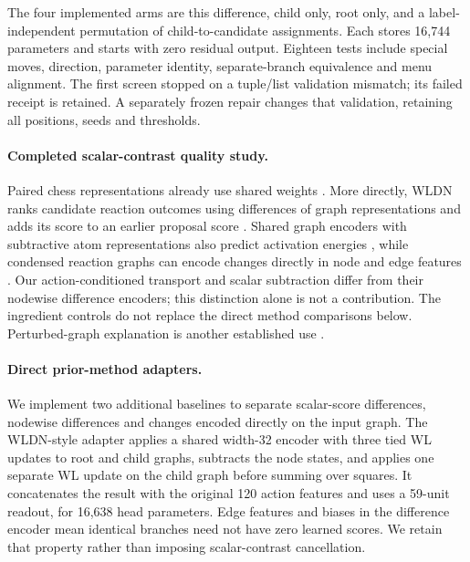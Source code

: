 The four implemented arms are this difference, child only, root only, and a
label-independent permutation of child-to-candidate assignments. Each stores
16,744 parameters and starts with zero residual output. Eighteen tests include
special moves, direction, parameter identity, separate-branch equivalence and
menu alignment. The first screen stopped on a tuple/list validation mismatch;
its failed receipt is retained. A separately frozen repair changes that
validation, retaining all positions, seeds and thresholds. \GraphContrastResults{}
\GraphContrastSharedResults{}

\paragraph{Completed scalar-contrast quality study.}
\GraphQualityResult{}


\AttackEditInputResult{}
\NormalizationInputResult{}

Paired chess representations already use shared weights \citep{david2017}.
More directly, WLDN ranks candidate reaction outcomes using differences of graph
representations and adds its score to an earlier proposal score
\citep{coley2019}. Shared graph encoders with subtractive atom representations
also predict activation energies \citep{grambow2020}, while condensed reaction
graphs can encode changes directly in node and edge features \citep{heid2022}.
Our action-conditioned transport and scalar subtraction differ from their
nodewise difference encoders; this distinction alone is not a contribution.
The ingredient controls do not replace the direct method comparisons below.
Perturbed-graph explanation is another established use \citep{lucic2022}.

\paragraph{Direct prior-method adapters.}
We implement two additional baselines to separate scalar-score differences,
nodewise differences and changes encoded directly on the input graph.
The WLDN-style adapter \citep{coley2019} applies a shared width-32 encoder with
three tied WL updates to root and child graphs, subtracts the node states, and
applies one separate WL update on the child graph before summing over squares.
It concatenates the result with the original 120 action features and uses a
59-unit readout, for 16,638 head parameters. Edge features and biases in the
difference encoder mean identical branches need not have zero learned scores.
We retain that property rather than imposing scalar-contrast cancellation.

